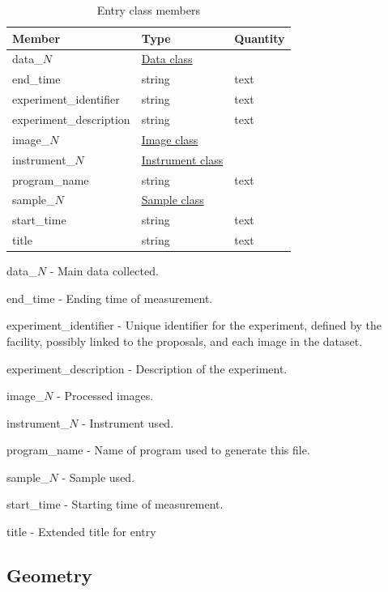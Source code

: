 \documentclass[usletter,11pt]{article}
\newcommand{\member}[2]
{ \noindent
{ \color{softBlue}  #1 - } #2
\vspace{0.2cm}
}
\begin{document}
\begin{table}[h!]\sffamily \footnotesize
\caption{Entry class members}

\begin{tabular}{p{4.5cm} p{4.5cm}  p{2.5cm} }
\toprule
\bfseries Member     & \bfseries Type & \bfseries Quantity \\
\midrule
data\_$N$ & \hyperref[table:data]{Data class} & \\
end\_time  & string & text \\  
experiment\_identifier & string  & text \\
experiment\_description & string & text \\
image\_$N$ & \hyperref[table:image]{Image class} & \\
instrument\_$N$ & \hyperref[table:instrument]{Instrument class} & \\ 
program\_name & string & text \\
sample\_$N$ & \hyperref[table:sample]{Sample class} &  \\
start\_time  & string & text  \\ 
title & string & text \\
\bottomrule
\end{tabular}
\end{table}


\member{data\_$N$}{Main data collected.}

\member{end\_time}{Ending time of measurement.}

\member{experiment\_identifier}{Unique identifier for the experiment,
defined by the facility, possibly linked to the proposals, and each image in the
dataset.}

\member{experiment\_description}{Description of the experiment.}

\member{image\_$N$}{Processed images.}

\member{instrument\_$N$}{Instrument used.}

\member{program\_name}{Name of program used to generate this file.}

\member{sample\_$N$}{Sample used.}

\member{start\_time}{Starting time of measurement.}

\member{title}{Extended title for entry}

\subsection{Geometry}
\label{table:geometry}
\end{document}
